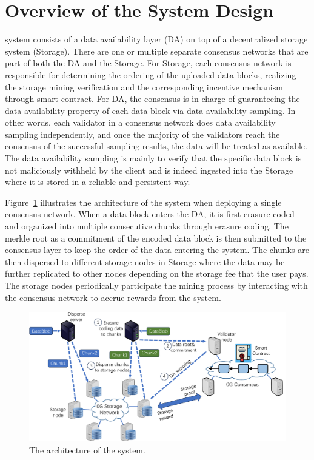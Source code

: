 \section{Overview of the System Design}

\projabbrev system consists of a data availability layer (\projabbrev DA) on top of a decentralized storage system (\projabbrev Storage). 
There are one or multiple separate consensus networks that are part of both the \projabbrev DA and the \projabbrev Storage. 
For \projabbrev Storage, each consensus network is responsible for determining the ordering of the uploaded data blocks, realizing the storage mining verification and the corresponding incentive mechanism through smart contract. For \projabbrev DA, the consensus is in charge of guaranteeing the data availability property of each data block via data availability sampling. 
In other words, each validator in a consensus network does data availability sampling independently, and once the majority of the validators reach the consensus of the successful sampling results, the data will be treated as available. 
The data availability sampling is mainly to verify that the specific data block is not maliciously withheld by the client and is indeed ingested into the \projabbrev Storage where it is stored in a reliable and persistent way. 



Figure~\ref{fig:0gda} illustrates the architecture of the \projabbrev system when deploying a single consensus network. When a data block enters the \projabbrev DA, it is first erasure coded and organized into multiple consecutive chunks through erasure coding. The merkle root as a commitment of the encoded data block is then submitted to the consensus layer to keep the order of the data entering the system. The chunks are then dispersed to different storage nodes in \projabbrev Storage where the data may be further replicated to other nodes depending on the storage fee that the user pays. The storage nodes periodically participate the mining process by interacting with the consensus network to accrue rewards from the system. 

\begin{figure}[H]	
	\includegraphics[width=\textwidth]{figure/0gda.pdf}
	\caption{The architecture of the \projabbrev system.}
	\label{fig:0gda}
\end{figure}

